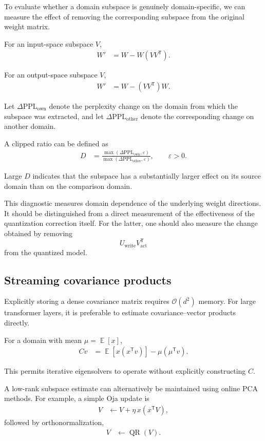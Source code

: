 \documentclass[11pt,a4paper]{article}
\DeclareMathOperator{\E}{\mathbb{E}}
\begin{document}
To evaluate whether a domain subspace is genuinely domain-specific,
we can measure the effect of removing the corresponding subspace from
the original weight matrix.

For an input-space subspace $V$,
\begin{align}
W'
&=
W-W(VV^{\mathsf T}).
\end{align}

For an output-space subspace $V$,
\begin{align}
W'
&=
W-(VV^{\mathsf T})W.
\end{align}

Let $\Delta\mathrm{PPL}_{\mathrm{own}}$ denote the perplexity change
on the domain from which the subspace was extracted, and let
$\Delta\mathrm{PPL}_{\mathrm{other}}$ denote the corresponding change
on another domain.

A clipped ratio can be defined as
\begin{align}
D
&=
\frac{
\max(\Delta\mathrm{PPL}_{\mathrm{own}},\varepsilon)
}{
\max(\Delta\mathrm{PPL}_{\mathrm{other}},\varepsilon)
},
\qquad
\varepsilon>0.
\end{align}

Large $D$ indicates that the subspace has a substantially larger
effect on its source domain than on the comparison domain.

This diagnostic measures domain dependence of the underlying weight
directions. It should be distinguished from a direct measurement of
the effectiveness of the quantization correction itself. For the
latter, one should also measure the change obtained by removing
\[
U_{\mathrm{write}}V_{\mathrm{act}}^{\mathsf T}
\]
from the quantized model.

\subsection{Streaming covariance products}

Explicitly storing a dense covariance matrix requires
$\mathcal{O}(d^2)$ memory. For large transformer layers, it is preferable
to estimate covariance--vector products directly.

For a domain with mean $\mu=\E[x]$,
\begin{align}
Cv
&=
\E[x(x^{\mathsf T}v)]
-
\mu(\mu^{\mathsf T}v).
\end{align}

This permits iterative eigensolvers to operate without explicitly
constructing $C$.

A low-rank subspace estimate can alternatively be maintained using
online PCA methods. For example, a simple Oja update is
\begin{align}
V
&\leftarrow
V+\eta\,x(x^{\mathsf T}V),
\end{align}
followed by orthonormalization,
\begin{align}
V
&\leftarrow
\operatorname{QR}(V).
\end{align}
\end{document}
